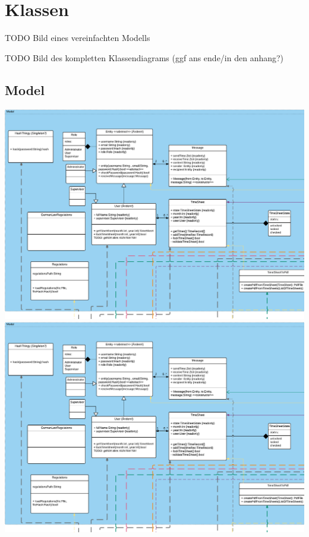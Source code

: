 \section{Klassen}
    TODO Bild eines vereinfachten Modells

    TODO Bild des kompletten Klassendiagrams (ggf ans ende/in den anhang?)
    \newpage
    \subsection{Model}
        \includegraphics[width=\linewidth,page=1]{Diagramms/class/model.pdf}\\
        \includegraphics[width=\linewidth,page=2]{Diagramms/class/model.pdf}\\

